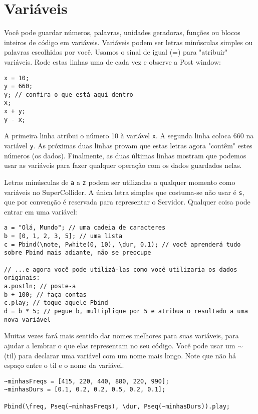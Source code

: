 \section{Variáveis}
\label{sec:variables}

Você pode guardar números, palavras, unidades geradoras, funções ou blocos inteiros de código em variáveis. Variáveis podem ser letras minúsculas simples ou palavras escolhidas por você. Usamos o sinal de igual (=) para "atribuir" variáveis. Rode estas linhas uma de cada vez e observe a Post window:

 
\begin{lstlisting}[style=SuperCollider-IDE, basicstyle=\scttfamily\footnotesize]
x = 10;
y = 660;
y; // confira o que está aqui dentro
x;
x + y;
y - x;
\end{lstlisting}
 

A primeira linha atribui o número 10 à variável \texttt{x}. A segunda linha coloca 660 na variável \texttt{y}. As próximas duas linhas provam que estas letras agora "contêm" estes números (os dados). Finalmente, as duas últimas linhas mostram que podemos usar as variáveis para fazer qualquer operação com os dados guardados nelas.

Letras minúsculas de \texttt{a} a \texttt{z} podem ser utilizadas a qualquer momento como variáveis no SuperCollider. A única letra simples que costuma-se não usar é \texttt{s}, que por convenção é reservada para representar o Servidor. Qualquer coisa pode entrar em uma variável:
 
\begin{lstlisting}[style=SuperCollider-IDE, basicstyle=\scttfamily\footnotesize]
a = "Olá, Mundo"; // uma cadeia de caracteres
b = [0, 1, 2, 3, 5]; // uma lista
c = Pbind(\note, Pwhite(0, 10), \dur, 0.1); // você aprenderá tudo sobre Pbind mais adiante, não se preocupe

// ...e agora você pode utilizá-las como você utilizaria os dados originais:
a.postln; // poste-a
b + 100; // faça contas
c.play; // toque aquele Pbind
d = b * 5; // pegue b, multiplique por 5 e atribua o resultado a uma nova variável
\end{lstlisting}

Muitas vezes fará mais sentido dar nomes melhores para suas variáveis, para ajudar a lembrar o que elas representam no seu código. Você pode usar um $\sim$ (til) para declarar uma variável com um nome mais longo. Note que não há espaço entre o til e o nome da variável.

\begin{lstlisting}[style=SuperCollider-IDE, basicstyle=\scttfamily\footnotesize]
~minhasFreqs = [415, 220, 440, 880, 220, 990];
~minhasDurs = [0.1, 0.2, 0.2, 0.5, 0.2, 0.1];

Pbind(\freq, Pseq(~minhasFreqs), \dur, Pseq(~minhasDurs)).play;
\end{lstlisting}
 

